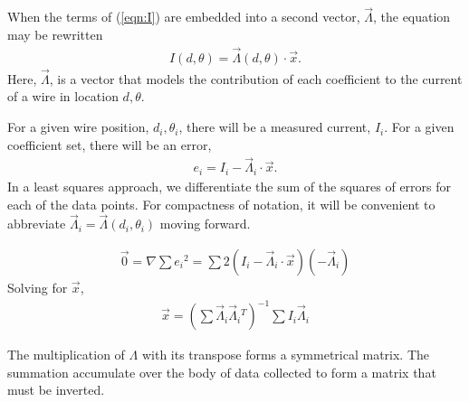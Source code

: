 \documentclass{article}
\begin{document}
When the terms of (\ref{eqn:I}) are embedded into a second vector, $\vec{\Lambda}$, the equation may be rewritten
\begin{align}
I(d,\theta) = \vec{\Lambda}(d,\theta) \cdot \vec{x}.
\end{align}
Here, $\vec{\Lambda}$, is a vector that models the contribution of each coefficient to the current of a wire in location $d,\theta$.

For a given wire position, $d_i, \theta_i$, there will be a measured current, $I_i$.  For a given coefficient set, there will be an error,
\begin{align}
e_i = I_i - \vec{\Lambda}_i \cdot \vec{x}.
\end{align}
In a least squares approach, we differentiate the sum of the squares of errors for each of the data points.  For compactness of notation, it will be convenient to abbreviate $\vec{\Lambda}_i = \vec{\Lambda}(d_i, \theta_i)$ moving forward.

\begin{align}
\vec{0} = \nabla \sum e_i {^2} = \sum 2(I_i - \vec{\Lambda}_i \cdot \vec{x})(- \vec{\Lambda}_i)
\end{align}
Solving for $\vec{x}$,
\begin{align}
\vec{x} = \left(\sum \vec{\Lambda}_i \vec{\Lambda}_i{^T}\right)^{-1} \sum I_i \vec{\Lambda}_i
\end{align}

The multiplication of $\Lambda$ with its transpose forms a symmetrical matrix.  The summation accumulate over the body of data collected to form a matrix that must be inverted.
\end{document}
